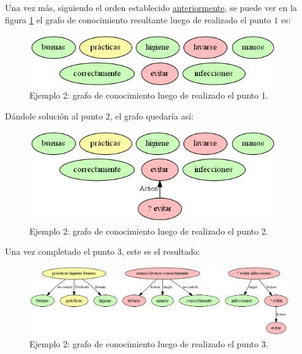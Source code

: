 Una vez más, siguiendo el orden establecido \hyperref[enum:knowledge_graph_build_order]{anteriormente}, se puede ver en la figura \ref{fig:knowledge_graph2.1} el grafo de conocimiento resultante luego de realizado el punto $1$ es:

\begin{figure}[H]
	\begin{center}
		\includegraphics[width=4.2in]{graphics/knowledge_graph_example2_1.png}
		\caption[Ejemplo 2: grafo de conocimiento luego de realizado el punto 1]{Ejemplo 2: grafo de conocimiento luego de realizado el punto 1.}
		\label{fig:knowledge_graph2.1}
	\end{center}
\end{figure}

Dándole solución al punto $2$, el grafo quedaría así:
\begin{figure}[H]
	\begin{center}
		\includegraphics[width=4.2in]{graphics/knowledge_graph_example2_2.png}
		\caption[Ejemplo 2: grafo de conocimiento luego de realizado el punto 2]{Ejemplo 2: grafo de conocimiento luego de realizado el punto 2.}
		\label{fig:knowledge_graph2.2}
	\end{center}
\end{figure}

Una vez completado el punto $3$, este es el resultado:
\begin{figure}[H]
	\begin{center}
		\includegraphics[width=\textwidth]{graphics/knowledge_graph_example2_3.png}
		\caption[Ejemplo 2: grafo de conocimiento luego de realizado el punto 3]{Ejemplo 2: grafo de conocimiento luego de realizado el punto 3.}
		\label{fig:knowledge_graph2.3}
	\end{center}
\end{figure}

